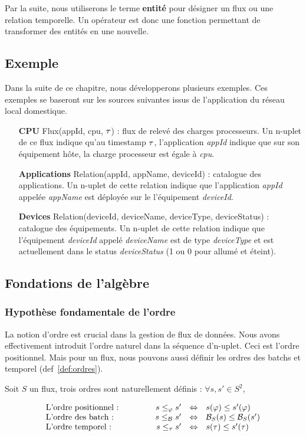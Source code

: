 Par la suite, nous utiliserons le terme \textbf{entité} pour désigner un flux ou une relation temporelle. Un opérateur est donc une fonction permettant de transformer des entités en une nouvelle.
\subsection{Exemple}\label{sec:contrib:astral:definitions:exemple}
Dans la suite de ce chapitre, nous développerons plusieurs exemples. Ces exemples se baseront sur les sources suivantes issus de l'application du réseau local domestique.
\begin{itemize}
    \item[\textbf{CPU}] Flux(appId, cpu, $\tau$) : flux de relevé des charges processeurs. Un n-uplet de ce flux indique qu'au timestamp $\tau$, l'application \textit{appId} indique que sur son équipement hôte, la charge processeur est égale à \textit{cpu}.
    \item[\textbf{Applications}] Relation(appId, appName, deviceId) : catalogue des applications. Un n-uplet de cette relation indique que l'application \textit{appId} appelée \textit{appName} est déployée sur le l'équipement \textit{deviceId}.
    \item[\textbf{Devices}] Relation(deviceId, deviceName, deviceType, deviceStatus) : catalogue des équipements. Un n-uplet de cette relation indique que l'équipement \textit{deviceId} appelé \textit{deviceName} est de type \textit{deviceType} et est actuellement dans le status \textit{deviceStatus} (1 ou 0 pour allumé et éteint).
\end{itemize}

\subsection{Fondations de l'algèbre}
\subsubsection{Hypothèse fondamentale de l'ordre}
La notion d'ordre est crucial dans la gestion de flux de données. Nous avons effectivement introduit l'ordre naturel dans la séquence d'n-uplet. Ceci est l'ordre positionnel. Mais pour un flux, nous pouvons aussi définir les ordres des batchs et temporel (def~\ref{def:ordres}).
\begin{defi}\label{def:ordres}
Soit $S$ un flux, trois ordres sont naturellement définis : $\forall s,s' \in S^2$,

$$\begin{array}{lcrcl} 
\textrm{L'ordre positionnel : } &\qquad & s \leq_\varphi s' & \Leftrightarrow & s(\varphi) \leq s'(\varphi)\\
\textrm{L'ordre des batch : } & & s \leq_{\mathcal{B}_{}} s' &\Leftrightarrow& \mathcal{B}_S(s) \leq \mathcal{B}_S(s')\\
\textrm{L'ordre temporel : } & & s \leq_\tau s' &\Leftrightarrow& s(\tau) \leq s'(\tau)\\
\end{array}$$
\end{defi}

